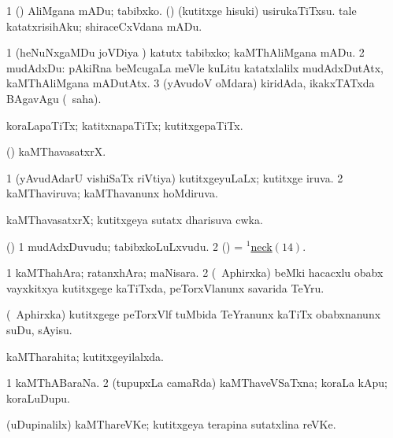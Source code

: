 \bentry
{}
\gl{\sakirx}
\bmng
\bnum
\num{1} (\ashi) AliMgana mADu; tabibxko. 
 (\ashi) 
\banum
{} (kutitxge hisuki) usirukaTiTxsu. 
 tale katatxrisihAku; shiraceCxVdana mADu. 
\eanum
\numie
\enum
\emng

\noindent
\gl{\akirx}
\bmng
\bnum
\num{1} (heNuNxgaMDu joVDiya \vi) katutx tabibxko; kaMThAliMgana mADu. 
\num{2} mudAdxDu:  pAkiRna beMcugaLa meVle kuLitu katatxlalilx mudAdxDutAtx, kaMThAliMgana mADutAtx. 
\num{3} (yAvudoV oMdara) kiridAda, ikakxTATxda BAgavAgu (\sakirx\ saha). 
\enum
\emng
\eentry

\bentry
{}
\gl{\nA}
\bmng
koraLapaTiTx; katitxnapaTiTx; kutitxgepaTiTx. 
\emng
\eentry

\bentry
{}
\gl{\nA}
\bmng
(\ca) kaMThavasatxrX. 
\emng
\eentry

\bentry
{}
\gl{\gu}
\bmng
\bnum
\num{1} (yAvudAdarU vishiSaTx riVtiya) kutitxgeyuLaLx; kutitxge iruva. 
\num{2} kaMThaviruva; kaMThavanunx hoMdiruva. 
\enum
\emng
\eentry

\bentry
{}
\gl{\nA}
\bmng
kaMThavasatxrX; kutitxgeya sutatx dharisuva cwka. 
\emng
\eentry

\bentry
{}
\gl{\nA}
\bmng
(\ashi) 
\bnum
\num{1} mudAdxDuvudu; tabibxkoLuLxvudu. 
\num{2} (\vAshi) = \hyperlink{neck(1)14}{$^1$neck\((14)\)}. 
\enum
\emng
\eentry

\bentry
{}
\gl{\nA}
\bmng
\bnum
\num{1} kaMThahAra; ratanxhAra; maNisara. 
\num{2} (\da\ Aphirxka) beMki hacacxlu obabx vayxkitxya kutitxgege kaTiTxda, peTorxVlanunx savarida TeYru. 
\enum
\emng
\eentry

\bentry
{}
\gl{\sakirx}
\bmng
(\da\ Aphirxka) kutitxgege peTorxVlf tuMbida TeYranunx kaTiTx obabxnanunx suDu, sAyisu. 
\emng
\eentry

\bentry
{}
\gl{\gu}
\bmng
kaMTharahita; kutitxgeyilalxda. 
\emng
\eentry

\bentry
{}
\gl{\nA}
\bmng
\bnum
\num{1} kaMThABaraNa. 
\num{2} (tupupxLa camaRda) kaMThaveVSaTxna; koraLa kApu; koraLuDupu. 
\enum
\emng
\eentry

\bentry
{}
\gl{\nA}
\bmng
(uDupinalilx) kaMThareVKe; kutitxgeya terapina sutatxlina reVKe. 
\emng
\eentry

